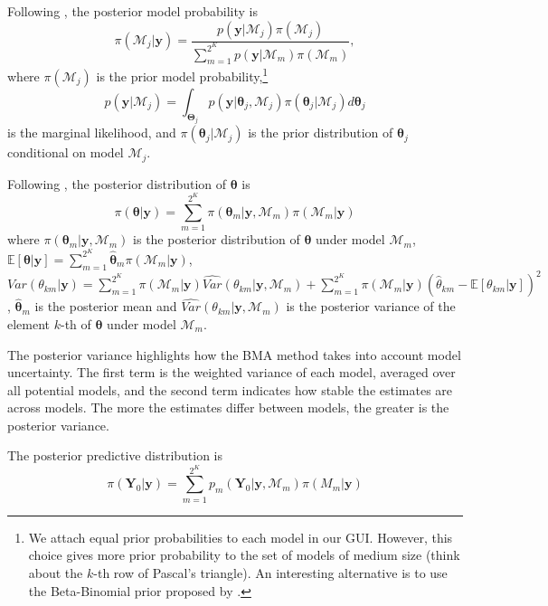 Following \cite{Simmons2010}, the posterior model probability is
\begin{equation*}
	\pi(\mathcal{M}_j |\bm{y})=\frac{p(\bm{y} | \mathcal{M}_j)\pi(\mathcal{M}_j)}{\sum_{m=1}^{2^K}p(\bm{y} | \mathcal{M}_m)\pi(\mathcal{M}_m)},
\end{equation*}
where $\pi(\mathcal{M}_j)$ is the prior model probability,\footnote{We attach equal prior probabilities to each model in our GUI. However, this choice gives more prior probability to the set of models of medium size (think about the $k$-th row of Pascal's triangle). An interesting alternative is to use the Beta-Binomial prior proposed by \cite{ley2009effect}.} 
\begin{equation*}
	p(\bm{y} | \mathcal{M}_j)=\int_{\bm{\Theta}_j} p(\bm{y}| \bm{\theta}_j,\mathcal{M}_j)\pi(\bm{\theta}_j | \mathcal{M}_j) d\bm{\theta}_{j}
\end{equation*}
is the marginal likelihood, and $\pi(\bm{\theta}_j | \mathcal{M}_j)$ is the prior distribution of $\bm{\theta}_j$ conditional on model $\mathcal{M}_j$.

Following \cite{Raftery93}, the posterior distribution of $\bm{\theta}$ is 
\begin{equation*}
	\pi(\bm{\theta}|\bm{y})= \sum_{m=1}^{2^K}\pi(\bm{\theta}_m|\bm{y},\mathcal{M}_m) \pi(\mathcal{M}_m|\bm{y})
\end{equation*}
where $\pi(\bm{\theta}_m|\bm{y},\mathcal{M}_m)$ is the posterior distribution of $\bm{\theta}$ under model $\mathcal{M}_m$, $\mathbb{E}[\bm{\theta}|\bm{y}]=\sum_{m=1}^{2^K}\hat{\bm{\theta}}_m \pi(\mathcal{M}_m|\bm{y})$, $Var({\theta}_{km}|\bm{y})= \sum_{m=1}^{2^K}\pi(\mathcal{M}_m|\bm{y}) \widehat{Var} ({\theta}_{km}|\bm{y},\mathcal{M}_m)+\sum_{m=1}^{2^K} \pi(\mathcal{M}_m|\bm{y}) (\hat{{\theta}}_{km}-\mathbb{E}[{\theta}_{km}|\bm{y}])^2$, $\hat{\bm{\theta}}_m$ is the posterior mean and $\widehat{Var}({\theta}_{km}|\bm{y},\mathcal{M}_m)$ is the posterior variance of the element $k$-th of $\bm{\theta}$ under model $\mathcal{M}_m$.

The posterior variance highlights how the BMA method takes into account
model uncertainty. The first term is the weighted variance of each model, averaged over all potential models, and the second term indicates how stable the estimates are across models. The more the estimates differ between models, the greater is the posterior variance.

The posterior predictive distribution is
\begin{equation*}
	\pi(\bm{Y}_0|\bm{y})= \sum_{m=1}^{2^K}p_m(\bm{Y}_0|\bm{y},\mathcal{M}_m) \pi(M_m|\bm{y})
\end{equation*}

